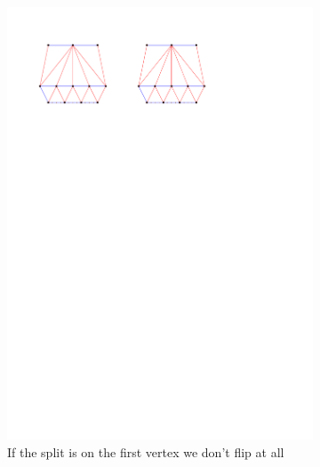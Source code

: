 \begin{figure}
\begin{subfigure}[b]{0.45 \textwidth}
    \end{subfigure}
    ~
    \begin{subfigure}[b]{0.45 \textwidth}
        \includegraphics[width =\textwidth]{topFanFlips/img/splitfront}
        \caption{If the split is on the first vertex we don't flip at all}
        \label{fig:fanflip:splitFirstVertex}

    \end{subfigure}

    \caption{}
    \label{fig:fanflip:fanflips}
\end{figure}




